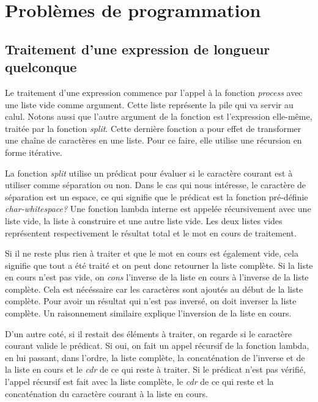 \documentclass[letterpaper,12pt]{scrartcl}
\begin{document}
	
    
	\section{Problèmes de programmation}
		\subsection{Traitement d'une expression de longueur quelconque }
        Le traitement d'une expression commence par l'appel à la fonction \textit{process} avec une liste vide comme argument. Cette liste représente la pile qui va servir au calul. Notons aussi que l'autre argument de la fonction est l'expression elle-même, traitée par la fonction \textit{split}. Cette dernière fonction a pour effet de transformer une chaîne de caractères en une liste. Pour ce faire, elle utilise une récursion en forme itérative.
        
        La fonction \textit{split} utilise un prédicat pour évaluer si le caractère courant est à utiliser comme séparation ou non. Dans le cas qui nous intéresse, le caractère de séparation est un espace, ce qui signifie que le prédicat est la fonction pré-définie \textit{char-whitespace?} Une fonction lambda interne est appelée récursivement avec une liste vide, la liste à construire et une autre liste vide. Les deux listes vides représentent respectivement le résultat total et le mot en cours de traitement. 
        
        Si il ne reste plus rien à traiter et que le mot en cours est également vide, cela signifie que tout a été traité et on peut donc retourner la liste complète. Si la liste en cours n'est pas vide, on \textit{cons} l'inverse de la liste en cours à l'inverse de la liste complète. Cela est nécéssaire car les caractères sont ajoutés au début de la liste complète. Pour avoir un résultat qui n'est pas inversé, on doit inverser la liste complète. Un raisonnement similaire explique l'inversion de la liste en cours.
        
        D'un autre coté, si il restait des éléments à traiter, on regarde si le caractère courant valide le prédicat. Si oui, on fait un appel récursif de la fonction lambda, en lui passant, dans l'ordre, la liste complète, la concaténation de l'inverse et de la liste en cours et le \textit{cdr} de ce qui reste à traiter. Si le prédicat n'est pas vérifié, l'appel récursif est fait avec la liste complète, le \textit{cdr} de ce qui reste et la concaténation du caractère courant à la liste en cours.
        
\end{document}
